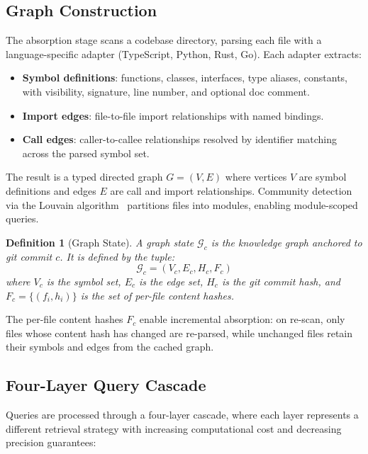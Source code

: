 \documentclass[conference]{IEEEtran}
\newtheorem{definition}{Definition}
\begin{document}
\subsection{Graph Construction}
\label{sec:approach:graph}

The absorption stage scans a codebase directory, parsing each file with
a language-specific adapter (TypeScript, Python, Rust, Go). Each adapter
extracts:

\begin{itemize}
  \item \textbf{Symbol definitions}: functions, classes, interfaces,
    type aliases, constants, with visibility, signature, line number,
    and optional doc comment.
  \item \textbf{Import edges}: file-to-file import relationships with
    named bindings.
  \item \textbf{Call edges}: caller-to-callee relationships resolved
    by identifier matching across the parsed symbol set.
\end{itemize}

The result is a typed directed graph $G = (V, E)$ where vertices $V$
are symbol definitions and edges $E$ are call and import relationships.
Community detection via the Louvain algorithm~\cite{Blondel2008}
partitions files into modules, enabling module-scoped queries.

\begin{definition}[Graph State]
A graph state $\mathcal{G}_c$ is the knowledge graph anchored to git
commit $c$. It is defined by the tuple:
\begin{equation}
  \mathcal{G}_c = (V_c, E_c, H_c, F_c)
  \label{eq:graph-state}
\end{equation}
where $V_c$ is the symbol set, $E_c$ is the edge set, $H_c$ is the
git commit hash, and $F_c = \{(f_i, h_i)\}$ is the set of per-file
content hashes.
\end{definition}

The per-file content hashes $F_c$ enable incremental absorption: on
re-scan, only files whose content hash has changed are re-parsed,
while unchanged files retain their symbols and edges from the cached
graph.

\subsection{Four-Layer Query Cascade}
\label{sec:approach:cascade}

Queries are processed through a four-layer cascade, where each layer
represents a different retrieval strategy with increasing computational
cost and decreasing precision guarantees:
\end{document}
